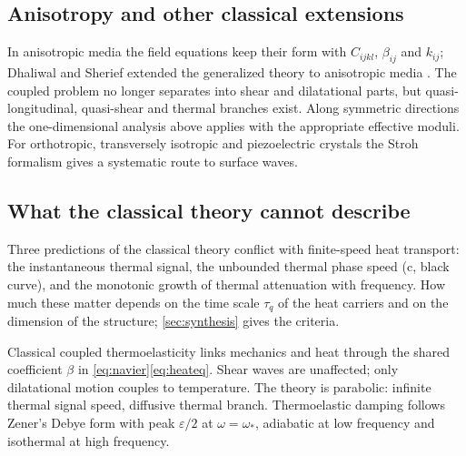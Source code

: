 \subsection{Anisotropy and other classical extensions}
In anisotropic media the field equations keep their form with $C_{ijkl}$, $\beta_{ij}$ and $k_{ij}$; Dhaliwal and Sherief extended the generalized theory to anisotropic media \citep{Dhaliwal1980}. The coupled problem no longer separates into shear and dilatational parts, but quasi-longitudinal, quasi-shear and thermal branches exist. Along symmetric directions the one-dimensional analysis above applies with the appropriate effective moduli. For orthotropic, transversely isotropic and piezoelectric crystals the Stroh formalism \citep{Stroh1958,Stroh1962} gives a systematic route to surface waves.

\subsection{What the classical theory cannot describe}
Three predictions of the classical theory conflict with finite-speed heat transport: the instantaneous thermal signal, the unbounded thermal phase speed (c, black curve), and the monotonic growth of thermal attenuation with frequency. How much these matter depends on the time scale $\tau_q$ of the heat carriers and on the dimension of the structure; \cref{sec:synthesis} gives the criteria.

\begin{summarybox}[Summary]
Classical coupled thermoelasticity links mechanics and heat through the shared coefficient $\beta$ in \eqref{eq:navier}\textendash\eqref{eq:heateq}. Shear waves are unaffected; only dilatational motion couples to temperature. The theory is parabolic: infinite thermal signal speed, diffusive thermal branch. Thermoelastic damping follows Zener's Debye form with peak $\varepsilon/2$ at $\omega=\omega_*$, adiabatic at low frequency and isothermal at high frequency.
\end{summarybox}
